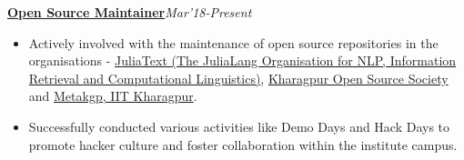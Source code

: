 \documentclass[a4paper,10pt]{extarticle} %
\begin{document}
\textbf{\href{https://github.com/Ayushk4}{Open Source Maintainer}}\hfill\textit{\small{Mar'18-Present}}
    \begin{itemize}[leftmargin=.15in]
        \item Actively involved with the maintenance of open source repositories in the organisations -  \href{https://github.com/JuliaText}{JuliaText (The JuliaLang Organisation for NLP, Information Retrieval and Computational Linguistics)}, \href{https://github.com/kossiitkgp}{Kharagpur Open Source Society} and \href{https://github.com/metakgp}{Metakgp, IIT Kharagpur}.
        \item Successfully conducted various activities like Demo Days and Hack Days to promote hacker culture and foster collaboration within the institute campus.
    \end{itemize}
\textbf{ }

\end{document}
